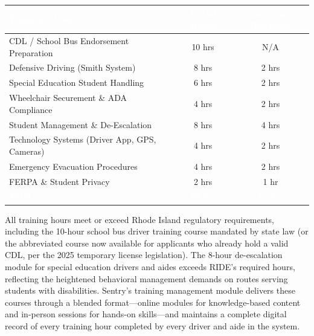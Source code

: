 \begin{tabularx}{\textwidth}{|X|c|c|}
\hline
\rowcolor{tableHeader}
\textcolor{white}{\textbf{Training Module}} &
\textcolor{white}{\textbf{Initial Hours}} &
\textcolor{white}{\textbf{Annual Refresher}} \\
\hline
CDL / School Bus Endorsement Preparation & 10 hrs & N/A \\ \hline
Defensive Driving (Smith System) & 8 hrs & 2 hrs \\ \hline
Special Education Student Handling & 6 hrs & 2 hrs \\ \hline
Wheelchair Securement \& ADA Compliance & 4 hrs & 2 hrs \\ \hline
Student Management \& De-Escalation & 8 hrs & 4 hrs \\ \hline
Technology Systems (Driver App, GPS, Cameras) & 4 hrs & 2 hrs \\ \hline
Emergency Evacuation Procedures & 4 hrs & 2 hrs \\ \hline
FERPA \& Student Privacy & 2 hrs & 1 hr \\ \hline
\rowcolor{tableHeader}
\textcolor{white}{\textbf{Total}} &
\textcolor{white}{\textbf{46 hrs}} &
\textcolor{white}{\textbf{15 hrs}} \\
\hline
\end{tabularx}

\vspace{0.3cm}

All training hours meet or exceed Rhode Island regulatory requirements, including the 10-hour school bus driver training course mandated by state law (or the abbreviated course now available for applicants who already hold a valid CDL, per the 2025 temporary license legislation). The 8-hour de-escalation module for special education drivers and aides exceeds RIDE's required hours, reflecting the heightened behavioral management demands on routes serving students with disabilities. Sentry's training management module delivers these courses through a blended format---online modules for knowledge-based content and in-person sessions for hands-on skills---and maintains a complete digital record of every training hour completed by every driver and aide in the system.

\vspace{0.3cm}


